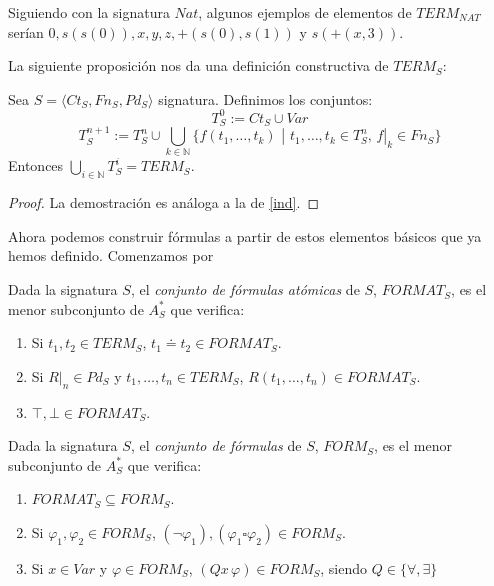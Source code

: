 \begin{example}
Siguiendo con la signatura $Nat$, algunos ejemplos de elementos de $TERM_{NAT}$ serían  $0, s(s(0)), x, y, z,+(s(0), s(1))$ y $s(+(x,3))$.
\end{example}

La siguiente proposición nos da una definición constructiva de $TERM_S$: 
\begin{prop}
Sea $S = \langle Ct_{S}, Fn_{S}, Pd_{S}\rangle$ signatura. Definimos los conjuntos:
$$T_{S}^{0} := Ct_S \cup Var$$
$$T_{S}^{n+1} := T_{S}^{n} \cup \bigcup\limits_{k \in \mathbb{N}} \{f(t_1, \dots, t_k) \, \, | \, \, t_1, \dots, t_k \in T_{S}^{n}, \, f|_{k} \in Fn_S\}$$
Entonces $\bigcup\limits_{i \in \mathbb{N}} T_{S}^{i} = TERM_S$.
\end{prop}
\begin{proof}
La demostración es análoga a la de \ref{ind}.
\end{proof}

Ahora podemos construir fórmulas a partir de estos elementos básicos que ya hemos definido. Comenzamos por 

\begin{definition}
Dada la signatura $S$, el \textit{conjunto de fórmulas atómicas} de $S$, $FORMAT_S$, es el menor subconjunto de $A_{S}^*$ que verifica:
\begin{enumerate}
    \item Si $t_1, t_2 \in TERM_S$, $t_1 \doteq t_2 \in FORMAT_S$.
    \item Si $R|_{n} \in Pd_S$ y $t_1, \dots, t_n \in TERM_S$, $R(t_1, \dots, t_n) \in FORMAT_S$.
    \item $\top, \bot \in FORMAT_S$.
\end{enumerate}
\end{definition}

\begin{definition}\label{form}
Dada la signatura $S$, el \textit{conjunto de fórmulas} de $S$, $FORM_S$, es el menor subconjunto de $A_{S}^*$ que verifica:
\begin{enumerate}
    \item $FORMAT_S \subseteq FORM_S$.
    \item Si $\varphi_1, \varphi_2 \in FORM_S$, $(\neg \varphi_1), (\varphi_1 \square \varphi_2) \in FORM_S$.
    \item Si $x \in Var$ y $\varphi \in FORM_S$, $(Qx \, \varphi) \in FORM_S$, siendo $Q\in\{\forall,\exists\}$
\end{enumerate}
\end{definition}


